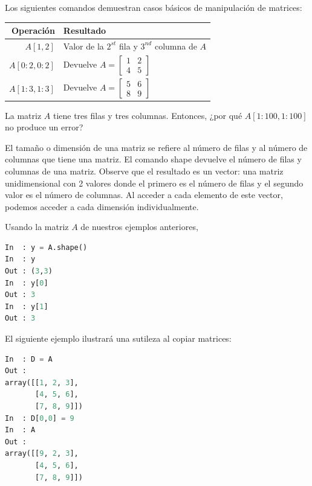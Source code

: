 Los siguientes comandos demuestran casos básicos de manipulación de matrices:
\vs

\begin{tabular}{r|l}
Operación 			& Resultado \\
\hline
$A[1,2]$ 				&  Valor de la $2^{st}$ fila y $3^{nd}$ columna de $A$\\
$A[0:2,0:2]$ 		&  Devuelve $A = \begin{bmatrix} 1 & 2 \\ 4 & 5\end{bmatrix} $\\
$A[1:3,1:3]$ 		&  Devuelve $A = \begin{bmatrix} 5 & 6 \\ 8 & 9\end{bmatrix} $\\
\hline
\end{tabular}

\vs

La matriz $A$ tiene tres filas y tres columnas. Entonces, ¿por qué $A[1:100,1:100]$ no produce un error? \QA

El tamaño o dimensión de una matriz se refiere al número de filas y
al número de columnas que tiene una matriz. El comando {\s shape} devuelve el número
de filas y columnas de una matriz.
Observe que el resultado es un vector: una matriz unidimensional con
2 valores donde el primero es el número de filas y el segundo valor
es el número de columnas. Al acceder a cada elemento de este vector,
podemos acceder a cada dimensión individualmente.

Usando la matriz $A$ de nuestros ejemplos anteriores,

\begin{lstlisting}[language=Python]
In 	: y = A.shape()
In 	: y
Out : (3,3)
In 	: y[0]
Out : 3
In 	: y[1]
Out : 3
\end{lstlisting}

El siguiente ejemplo ilustrará una sutileza al copiar matrices:

\begin{lstlisting}[language=Python]
In 	: D = A
Out :
array([[1, 2, 3],
       [4, 5, 6],
       [7, 8, 9]])
In 	: D[0,0] = 9
In 	: A
Out :
array([[9, 2, 3],
       [4, 5, 6],
       [7, 8, 9]])
\end{lstlisting}

